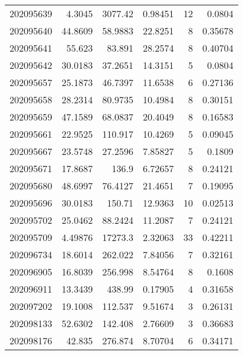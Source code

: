 \begin{tabular}{rrrrrr}
 202095639 &          4.3045  &     3077.42   &            0.98451 &          12 & 0.0804  \\
 202095640 &         44.8609  &       58.9883 &           22.8251  &           8 & 0.35678 \\
 202095641 &         55.623   &       83.891  &           28.2574  &           8 & 0.40704 \\
 202095642 &         30.0183  &       37.2651 &           14.3151  &           5 & 0.0804  \\
 202095657 &         25.1873  &       46.7397 &           11.6538  &           6 & 0.27136 \\
 202095658 &         28.2314  &       80.9735 &           10.4984  &           8 & 0.30151 \\
 202095659 &         47.1589  &       68.0837 &           20.4049  &           8 & 0.16583 \\
 202095661 &         22.9525  &      110.917  &           10.4269  &           5 & 0.09045 \\
 202095667 &         23.5748  &       27.2596 &            7.85827 &           5 & 0.1809  \\
 202095671 &         17.8687  &      136.9    &            6.72657 &           8 & 0.24121 \\
 202095680 &         48.6997  &       76.4127 &           21.4651  &           7 & 0.19095 \\
 202095696 &         30.0183  &      150.71   &           12.9363  &          10 & 0.02513 \\
 202095702 &         25.0462  &       88.2424 &           11.2087  &           7 & 0.24121 \\
 202095709 &          4.49876 &    17273.3    &            2.32063 &          33 & 0.42211 \\
 202096734 &         18.6014  &      262.022  &            7.84056 &           7 & 0.32161 \\
 202096905 &         16.8039  &      256.998  &            8.54764 &           8 & 0.1608  \\
 202096911 &         13.3439  &      438.99   &            0.17905 &           4 & 0.31658 \\
 202097202 &         19.1008  &      112.537  &            9.51674 &           3 & 0.26131 \\
 202098133 &         52.6302  &      142.408  &            2.76609 &           3 & 0.36683 \\
 202098176 &         42.835   &      276.874  &            8.70704 &           6 & 0.34171 \\

\end{tabular}
